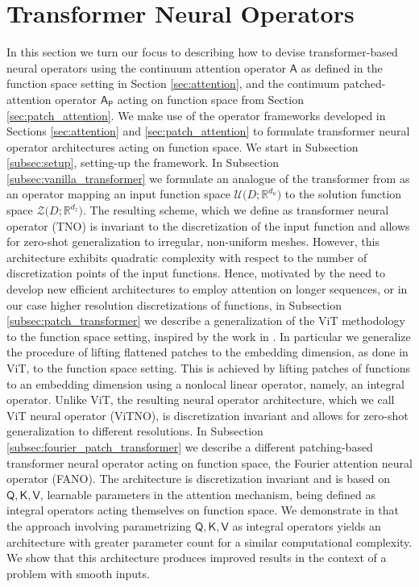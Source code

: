 \documentclass[twoside]{article}
\newcommand{\1}{\mathbbm{1}}
\newcommand{\R}{\mathbbm{R}}
\newcommand{\cU}{\mathcal{U}}
\newcommand{\cZ}{\mathcal{Z}}
\newcommand{\sA}{\mathsf{A}}
\newcommand{\sAp}{\mathsf{A}_{\mathsf{P}}}
\newcommand{\sQ}{\mathsf{Q}}
\newcommand{\sK}{\mathsf{K}}
\newcommand{\sV}{\mathsf{V}}
\providecommand{\mathbbm}{\mathbb} %
\begin{document}
\section{Transformer Neural Operators}
\label{sec:transformers_operator}


In this section we turn our focus to describing how to devise transformer-based neural operators using the continuum attention operator $\sA$ as defined in the function space setting in Section \ref{sec:attention}, and the continuum patched-attention operator $\sAp$ acting on function space from Section \ref{sec:patch_attention}. 
We make use of the operator frameworks developed in Sections \ref{sec:attention} and \ref{sec:patch_attention} to formulate transformer neural operator architectures acting on function space. We start in Subsection \ref{subsec:setup}, setting-up the framework. In Subsection \ref{subsec:vanilla_transformer} we formulate an analogue of the transformer from \citet{vaswani2017attention} as an operator mapping an input function space $\cU\bigl(D;\R^{d_u}\bigr)$ to the solution function space $\cZ\bigl(D;\R^{d_z}\bigr)$. The resulting scheme, which we define as transformer neural operator (TNO) is invariant to the discretization of the input function and allows for zero-shot generalization to irregular, non-uniform meshes. However, this architecture exhibits quadratic complexity with respect to the number of discretization points of the input functions. Hence, motivated by the need to develop new efficient architectures to employ attention on longer sequences, or in our case higher resolution discretizations of functions, in Subsection \ref{subsec:patch_transformer} we describe a generalization of the ViT methodology to the function space setting, inspired by the work in \citet{dosovitskyi2021image}. In particular we generalize the procedure of lifting flattened patches to the embedding dimension, as done in ViT, to the function space setting. This is achieved by lifting patches of functions to an embedding dimension using a nonlocal linear operator, namely, an integral operator. Unlike ViT, the resulting neural operator architecture, which we call ViT neural operator (ViTNO), is discretization invariant and allows for zero-shot generalization to different resolutions. In Subsection \ref{subsec:fourier_patch_transformer} we describe a different patching-based transformer neural operator acting on function space, the Fourier attention neural operator (FANO). The architecture is discretization invariant and is based on $\sQ,\sK, \sV$, learnable parameters in the attention mechanism, being defined as integral operators acting themselves on function space. We demonstrate in  that the approach involving parametrizing $\sQ,\sK, \sV$ as integral operators yields an architecture with greater parameter count for a similar computational complexity. We show that this architecture produces improved results in the context of a problem with smooth inputs.
\end{document}

